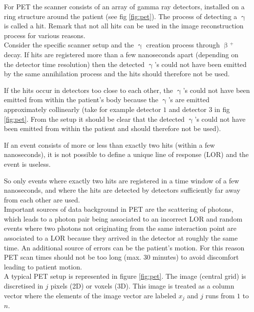 \documentclass[report,12pt]{report}
\newcommand{\superscript}[1]{\ensuremath{^{\textrm{#1}}}}
\begin{document}
For PET the scanner consists of an array of gamma ray detectors, installed on a ring structure around the patient (see fig \ref{fig:pet}). The process of detecting a $\upgamma$ is called a hit. Remark that not all hits can be used in the image reconstruction process for various reasons.\\

Consider the specific scanner setup and the $\upgamma$ creation process through $\upbeta$\superscript{+} decay. If hits are registered more than a few nanoseconds apart (depending on the detector time resolution) then the detected $\upgamma$'s could not have been emitted by the same annihilation process and the hits should therefore not be used.

If the hits occur in detectors too close to each other, the $\upgamma$'s could not have been emitted from within the patient's body because the $\upgamma$'s are emitted approximately collinearly (take for example detector $1$ and detector $3$ in fig \ref{fig:pet}. From the setup it should be clear that the detected $\upgamma$'s could not have been emitted from within the patient and should therefore not be used). 

If an event consists of more or less than exactly two hits (within a few nanoseconds), it is not possible to define a unique line of response (LOR) and the event is useless.

So only events where exactly two hits are registered in a time window of a few nanoseconds, and where the hits are detected by detectors sufficiently far away from each other are used.\\

Important sources of data background in PET are the scattering of photons, which leads to a photon pair being associated to an incorrect LOR and random events where two photons not originating from the same interaction point are associated to a LOR because they arrived in the detector at roughly the same time. An additional source of errors can be the patient's motion. For this reason PET scan times should not be too long (max. 30 minutes) to avoid discomfort leading to patient motion.\\

A typical PET setup is represented in figure \ref{fig:pet}. The image (central grid) is discretised in $j$ pixels (2D) or voxels (3D). This image is treated as a column vector where the elements of the image vector are labeled $x_j$ and $j$ runs from $1$ to $n$.\\
\end{document}
